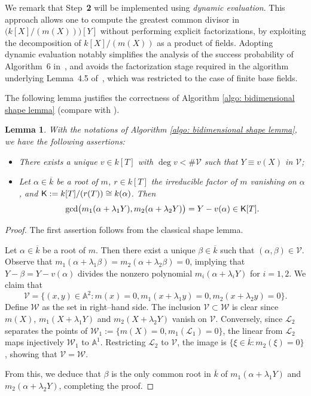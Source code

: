 \documentclass[pdflatex,sn-basic]{sn-jnl}%
\theoremstyle{thmstyleone}%
\theoremstyle{thmstyletwo}%
\theoremstyle{thmstylethree}%
\newtheorem{lemma}[theorem]{Lemma}
\theoremstyle{definition}
\numberwithin{equation}{section}
\newcommand{\A}{\mathbb A}
\newcommand{\ck}{\overline{k}}
\begin{document}
We remark that Step~{\bf 2} will be implemented using \emph{dynamic
evaluation}. This approach allows one to compute the greatest common
divisor in $\big(k[X]/(m(X))\big)[Y]$ without performing explicit
factorizations, by exploiting the decomposition of $k[X]/(m(X))$ as
a product of fields. Adopting dynamic evaluation notably simplifies
the analysis of the success probability of Algorithm~6
in~\cite{HeMaWa01}, and avoids the factorization stage required in
the algorithm underlying Lemma~4.5 of~\cite{CaMa06a}, which was
restricted to the case of finite base fields.


The following lemma justifies the correctness of Algorithm
\ref{algo: bidimensional shape lemma} (compare with \cite[Lemma
6]{HeMaWa01}).
%
\begin{lemma}
With the notations of Algorithm \ref{algo: bidimensional shape
lemma}, we have the following assertions:
%
\begin{itemize}
  \item There exists a unique $v\in k[T]$ with $\deg
  v<\#\mathcal{V}$ such that $Y\equiv v(X)$ in $\mathcal{V}$;
  \item Let $\alpha\in\ck$ be a root of $m$, $r\in k[T]$ the
  irreducible factor of $m$ vanishing on $\alpha$, and ${\sf
  K}:=k[T]/(r(T))\cong k(\alpha)$. Then
%
$$\mathrm{gcd}\big(m_1(\alpha+\lambda_1 Y),m_2(\alpha+\lambda_2 Y)\big)
=Y-v(\alpha)\in {\sf
  K}[T].$$
\end{itemize}
\end{lemma}
%
\begin{proof}
The first assertion follows from the classical shape lemma.

Let $\alpha\in\ck$ be a root of $m$. Then there exist a unique
$\beta\in\ck$ such that $(\alpha,\beta)\in\mathcal{V}$. Observe that
$m_1(\alpha+\lambda_1\beta)=m_2(\alpha+\lambda_2\beta)=0$, implying
that $Y-\beta=Y-v(\alpha)$ divides the nonzero polynomial
$m_i(\alpha+\lambda_iY)$ for $i=1,2$. We claim that
%
$$\mathcal{V}=\{(x,y)\in\A^2:m(x)=0,m_1(x+\lambda_1 y)=0,m_2(x+\lambda_2 y)=0\}.$$
%
Define $\mathcal{W}$ as the set in right--hand side. The
inclusion $\mathcal{V}\subset\mathcal{W}$ is clear since
$m(X)$, $m_1(X+\lambda_1 Y)$ and $m_2(X+\lambda_2 Y)$
vanish on $\mathcal{V}$. Conversely, since $\mathcal{L}_2$
separates the points of
$\mathcal{W}_1:=\{m(X)=0,m_1(\mathcal{L}_1)=0\}$, the linear from
$\mathcal{L}_2$ maps injectively $\mathcal{W}_1$ to $\A^1$.
Restricting $\mathcal{L}_2$ to $\mathcal{V}$, the image is
$\{\xi\in\ck:m_2(\xi)=0\}$, showing that
$\mathcal{V}=\mathcal{W}$.

From this, we deduce that $\beta$ is the only common root in
$\ck$ of $m_1(\alpha+\lambda_1Y)$ and $m_2(\alpha+\lambda_2Y)$,
completing the proof.
\end{proof}
\end{document}

